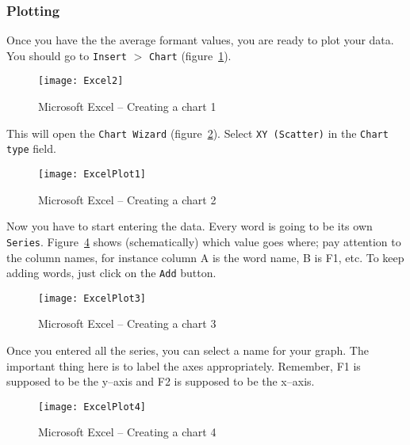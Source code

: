 \documentclass{article}
\newcommand{\soft}[1]{\textsf{#1}}
\newcommand{\softmenu}[1]{\texttt{#1}}
\newcommand{\MSExcel}{\soft{Microsoft\texttrademark{} Excel}}
\begin{document}
\subsubsection{Plotting}

Once you have the the average formant values, you are ready to plot your data. You should go to \softmenu{Insert} $>$ \softmenu{Chart} (figure~\ref{step1plot}).

\begin{figure}[!tbp]
\caption{\MSExcel{} -- Creating a chart 1}
\label{step1plot}
	\begin{center}
		\texttt{[image: Excel2]}
	\end{center}
\end{figure}

This will open the \softmenu{Chart Wizard} (figure~\ref{step2plot}). Select \softmenu{XY (Scatter)} in the \softmenu{Chart type} field.

\begin{figure}[!tbp]
\caption{\MSExcel{} -- Creating a chart 2}
\label{step2plot}
	\begin{center}
		\texttt{[image: ExcelPlot1]}
	\end{center}
\end{figure}

Now you have to start entering the data. Every word is going to be its own \softmenu{Series}. Figure~\ref{step3plot} shows (schematically) which value goes where; pay attention to the column names, for instance column A is the word name, B is F1, etc. To keep adding words, just click on the \softmenu{Add} button.

\begin{figure}[!tbp]
\caption{\MSExcel{} -- Creating a chart 3}
\label{step3plot}
	\begin{center}
		\texttt{[image: ExcelPlot3]}
	\end{center}
\end{figure}

Once you entered all the series, you can select a name for your graph. The important thing here is to label the axes appropriately. Remember, F1 is supposed to be the y--axis and F2 is supposed to be the x--axis.

\begin{figure}[!tbp]
\caption{\MSExcel{} -- Creating a chart 4}
\label{step3plot}
	\begin{center}
		\texttt{[image: ExcelPlot4]}
	\end{center}
\end{figure}
\end{document}
